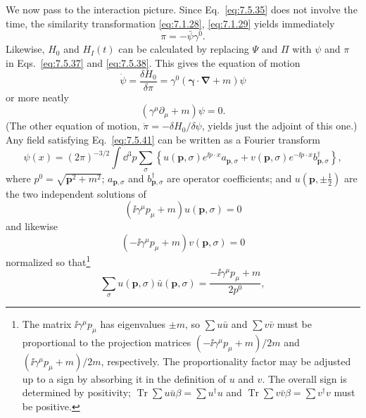 We now pass to the interaction picture. Since Eq.~\eqref{eq:7.5.35} does not involve
the time, the similarity transformation \eqref{eq:7.1.28}, \eqref{eq:7.1.29} yields immediately
\begin{equation}
\pi=-\bar\psi\gamma^0.
\tag{7.5.39}\label{eq:7.5.39}
\end{equation}
Likewise, $H_0$ and $H_I(t)$ can be calculated by replacing $\Psi$ and $\Pi$
with $\psi$ and $\pi$ in Eqs.~\eqref{eq:7.5.37} and \eqref{eq:7.5.38}. This gives the equation
of motion
\begin{equation}
\dot\psi=\frac{\delta H_0}{\delta\pi}
=\gamma^0(\boldsymbol\gamma\cdot\boldsymbol\nabla+m)\psi
\tag{7.5.40}\label{eq:7.5.40}
\end{equation}
or more neatly
\begin{equation}
(\gamma^\mu\partial_\mu+m)\psi=0.
\tag{7.5.41}\label{eq:7.5.41}
\end{equation}
(The other equation of motion, $\dot\pi=-\delta H_0/\delta\psi$, yields just
the adjoint of this one.) Any field satisfying Eq.~\eqref{eq:7.5.41} can be written as
a Fourier transform
\begin{equation}
\psi(x)=(2\pi)^{-3/2}\int \dd^3p\sum_\sigma
\left\{u(\mathbf p,\sigma)e^{\ii p\cdot x}a_{\mathbf p,\sigma}
+v(\mathbf p,\sigma)e^{-\ii p\cdot x}b^\dagger_{\mathbf p,\sigma}\right\},
\tag{7.5.42}\label{eq:7.5.42}
\end{equation}
where $p^0=\sqrt{\mathbf p^2+m^2}$; $a_{\mathbf p,\sigma}$ and
$b^\dagger_{\mathbf p,\sigma}$ are operator coefficients; and
$u(\mathbf p,\mathord\pm\frac12)$ are the two independent solutions of
\begin{equation}
(\ii\gamma^\mu p_\mu+m)u(\mathbf p,\sigma)=0
\tag{7.5.43}\label{eq:7.5.43}
\end{equation}
and likewise
\begin{equation}
(-\ii\gamma^\mu p_\mu+m)v(\mathbf p,\sigma)=0
\tag{7.5.44}\label{eq:7.5.44}
\end{equation}
normalized so that\footnote{The matrix $\ii\gamma^\mu p_\mu$ has eigenvalues
$\pm m$, so $\sum u\bar u$ and $\sum v\bar v$ must be proportional to the
projection matrices $(-\ii\gamma^\mu p_\mu+m)/2m$ and
$(\ii\gamma^\mu p_\mu+m)/2m$, respectively. The proportionality factor may be
adjusted up to a sign by absorbing it in the definition of $u$ and $v$. The
overall sign is determined by positivity; $\operatorname{Tr}\sum u\bar u\beta
=\sum u^\dagger u$ and $\operatorname{Tr}\sum v\bar v\beta
=\sum v^\dagger v$ must be positive.}
\begin{equation}
\sum_\sigma u(\mathbf p,\sigma)\bar u(\mathbf p,\sigma)
=\frac{-\ii\gamma^\mu p_\mu+m}{2p^0},
\tag{7.5.45}\label{eq:7.5.45}
\end{equation}
